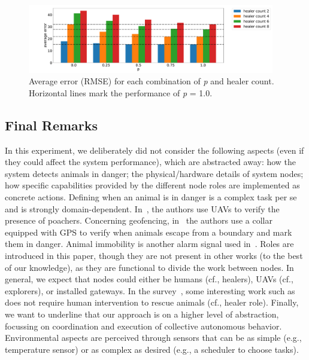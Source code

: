 \documentclass[jsan,article,accept,moreauthors,pdftex]{Definitions/mdpi}
\begin{document}
\begin{figure}[H]
\widefigure
\includegraphics[width=0.96\textwidth]{imgs/box-plot.pdf}
\caption{Average error (RMSE) for each combination of \emph{p} and {healer count}.
 Horizontal lines mark the performance of \emph{p} = 1.0. }
\label{fig:stack-plot-error}
\end{figure}
\begin{paracol}{2}
\switchcolumn
\vspace{-12pt}

\subsection{Final Remarks} \label{sb:case-study-remarks}

In this experiment, we deliberately did not 
 consider the following aspects (even if they could affect 
 the system performance), which are abstracted away:
  how the system detects animals in danger;
  the physical/hardware details of system nodes;
  how specific capabilities provided by the different node roles
  are implemented as concrete actions.
%
Defining when an animal is in danger is a complex task {per se}
 and is strongly domain-dependent. 
%
In~\cite{MuleroPzmny2014}, the authors use UAVs to verify the presence of poachers.
%
Concerning geofencing, in~\cite{Marini2018} the authors use a collar equipped with 
 GPS to verify when animals escape from a boundary and mark them in danger.
%
Animal immobility is another alarm signal used in~\cite{Wall2014}.
%
Roles are introduced in this paper, though they are not present in other works (to the best of our knowledge),
 as they are functional to divide the work between nodes.
%
 In general, we expect that nodes could either be humans (cf., healers), UAVs (cf., explorers), or installed gateways.
%
In the survey~\cite{JimnezLpez2019}, some interesting work such as ~\cite{Hahn2016} does not require human intervention to rescue animals (cf., healer role).
%
Finally, we want to underline that our approach is on a higher level of abstraction, focussing on coordination and execution of collective autonomous behavior. 
%
Environmental aspects are perceived through sensors that can 
 be as simple (e.g., temperature sensor) or as complex as desired 
 (e.g., a scheduler to choose tasks).


\end{paracol}
\end{document}
